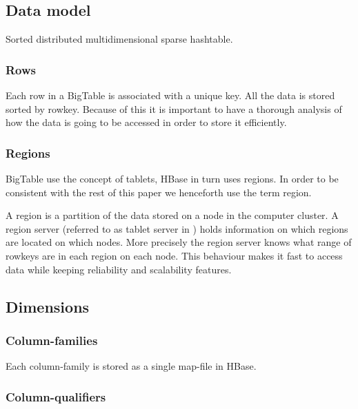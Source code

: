\documentclass[a4paper,10pt]{book}
\begin{document}
\subsection{Data model}

Sorted distributed multidimensional sparse hashtable.


\subsubsection{Rows}

Each row in a BigTable is associated with a unique key. All the data is
stored sorted by rowkey. Because of this it is important to have a thorough
analysis of how the data is going to be accessed in order to store it
efficiently.



\subsubsection{Regions}

BigTable use the concept of tablets, HBase in turn uses regions. In order
to be consistent with the rest of this paper we henceforth use the term
region.

A region is a partition of the data stored on a node in the computer
cluster. A region server (referred to as tablet server in \cite{bigtable})
holds information on which regions are located on which nodes. More
precisely the region server knows what range of rowkeys are in each region
on each node. This behaviour makes it fast to access data while keeping
reliability and scalability features.


\subsection{Dimensions}

\subsubsection{Column-families}

Each column-family is stored as a single map-file in HBase.


\subsubsection{Column-qualifiers}
\end{document}
